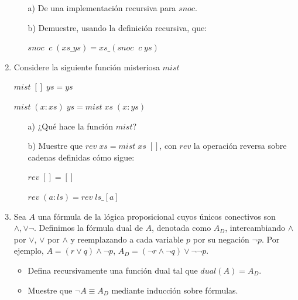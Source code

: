 \documentclass[letterpaper,11pt]{article}
\begin{document}
\begin{enumerate}
    \begin{itemize}
        \item[a)] De una implementación recursiva para $snoc$.
        \item[b)] Demuestre, usando la definición recursiva, que:
        \begin{center}
            $snoc \; \; c \; (xs\_ys) = xs\_ (snoc \; \; c \; ys)$
        \end{center} 
    \end{itemize}

    \item Considere la siguiente función misteriosa $mist$
    \begin{center}
        $mist \; [] \; ys = ys$

        $mist \; (x : xs) \;  ys = mist \; xs \; (x : ys)$
    \end{center}

    \begin{itemize}
        \item[a)] ¿Qué hace la función $mist$?
        \item[b)] Muestre que $rev \; xs = mist \; xs \; []$, con $rev$ la 
        operación reversa sobre cadenas definidas cómo sigue: 
        \begin{center}
            $rev \; [] = []$

            $rev \; (a : ls) = rev \; ls\_[a]$
        \end{center}
    \end{itemize}

    \item Sea $A$ una fórmula de la lógica proposicional cuyos únicos 
    conectivos son $\land, \lor \neg$. Definimos la fórmula dual de $A$, 
    denotada como $A_{D}$, intercambiando $\land$ por $\lor$, $\lor$ por 
    $\land$ y reemplazando a cada variable $p$ por su negación $\neg p$.
    Por ejemplo, $A = (r \lor q) \land \neg p$, $A_{D} = (\neg r \land \neg q)
    \lor \neg \neg p$.
    \begin{itemize}
        \item Defina recursivamente una función dual tal que $dual(A) = A_{D}$.
        \item Muestre que $\neg A \equiv A_{D}$ mediante inducción sobre 
        fórmulas.
    \end{itemize}


\end{enumerate}
\end{document}
